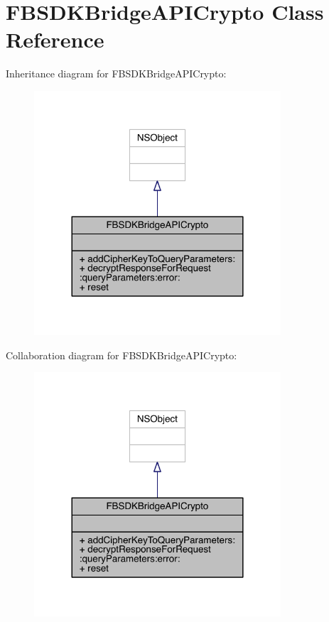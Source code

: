 \hypertarget{interface_f_b_s_d_k_bridge_a_p_i_crypto}{\section{F\-B\-S\-D\-K\-Bridge\-A\-P\-I\-Crypto Class Reference}
\label{interface_f_b_s_d_k_bridge_a_p_i_crypto}
}


Inheritance diagram for F\-B\-S\-D\-K\-Bridge\-A\-P\-I\-Crypto\-:
\nopagebreak
\begin{figure}[H]
\begin{center}
\leavevmode
\includegraphics[width=260pt]{interface_f_b_s_d_k_bridge_a_p_i_crypto__inherit__graph}
\end{center}
\end{figure}


Collaboration diagram for F\-B\-S\-D\-K\-Bridge\-A\-P\-I\-Crypto\-:
\nopagebreak
\begin{figure}[H]
\begin{center}
\leavevmode
\includegraphics[width=260pt]{interface_f_b_s_d_k_bridge_a_p_i_crypto__coll__graph}
\end{center}
\end{figure}
